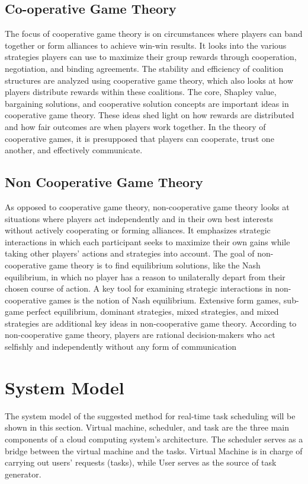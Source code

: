 \documentclass[conference]{IEEEtran}
\begin{document}
\subsection{Co-operative Game Theory}
The focus of cooperative game theory is on circumstances where players can band together or form alliances to achieve win-win results. It looks into the various strategies players can use to maximize their group rewards through cooperation, negotiation, and binding agreements. The stability and efficiency of coalition structures are analyzed using cooperative game theory, which also looks at how players distribute rewards within these coalitions. The core, Shapley value, bargaining solutions, and cooperative solution concepts are important ideas in cooperative game theory. These ideas shed light on how rewards are distributed and how fair outcomes are when players work together. In the theory of cooperative games, it is presupposed that players can cooperate, trust one another, and effectively communicate.\cite{Ichiishi1990Comparative}
\subsection{Non Cooperative Game Theory}
As opposed to cooperative game theory, non-cooperative game theory looks at situations where players act independently and in their own best interests without actively cooperating or forming alliances. It emphasizes strategic interactions in which each participant seeks to maximize their own gains while taking other players' actions and strategies into account. The goal of non-cooperative game theory is to find equilibrium solutions, like the Nash equilibrium, in which no player has a reason to unilaterally depart from their chosen course of action. A key tool for examining strategic interactions in non-cooperative games is the notion of Nash equilibrium. Extensive form games, sub-game perfect equilibrium, dominant strategies, mixed strategies, and mixed strategies are additional key ideas in non-cooperative game theory. According to non-cooperative game theory, players are rational decision-makers who act selfishly and independently without any form of communication\cite{Kamecke1989Non}

\bigskip
\section{\textbf{System Model}}
The system model of the suggested method for real-time task scheduling will be shown in this section. Virtual machine, scheduler, and task are the three main components of a cloud computing system's architecture. The scheduler serves as a bridge between the virtual machine and the tasks. Virtual Machine is in charge of carrying out users' requests (tasks), while User serves as the source of task generator.
\end{document}

